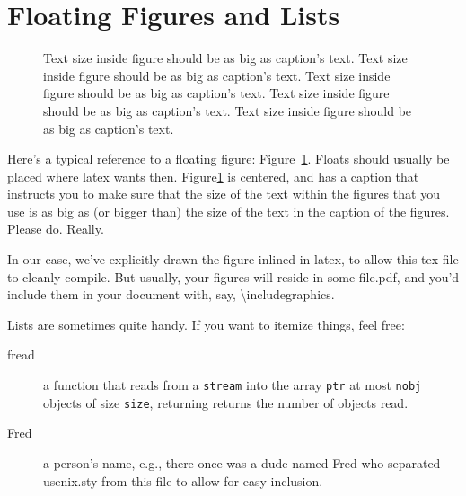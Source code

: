 \section{Floating Figures and Lists}
\label{sec:figs}
\begin{figure}
\begin{center}
\end{center}
\caption{\label{fig:vectors} Text size inside figure should be as big as
  caption's text. Text size inside figure should be as big as
  caption's text. Text size inside figure should be as big as
  caption's text. Text size inside figure should be as big as
  caption's text. Text size inside figure should be as big as
  caption's text. }
\end{figure}

Here's a typical reference to a floating figure:
Figure~\ref{fig:vectors}. Floats should usually be placed where latex
wants then. Figure\ref{fig:vectors} is centered, and has a caption
that instructs you to make sure that the size of the text within the
figures that you use is as big as (or bigger than) the size of the
text in the caption of the figures. Please do. Really.

In our case, we've explicitly drawn the figure inlined in latex, to
allow this tex file to cleanly compile. But usually, your figures will
reside in some file.pdf, and you'd include them in your document
with, say, \textbackslash{}includegraphics.

Lists are sometimes quite handy. If you want to itemize things, feel
free:

\begin{description}
  
\item[fread] a function that reads from a \texttt{stream} into the
  array \texttt{ptr} at most \texttt{nobj} objects of size
  \texttt{size}, returning returns the number of objects read.

\item[Fred] a person's name, e.g., there once was a dude named Fred
  who separated usenix.sty from this file to allow for easy
  inclusion.
\end{description}


